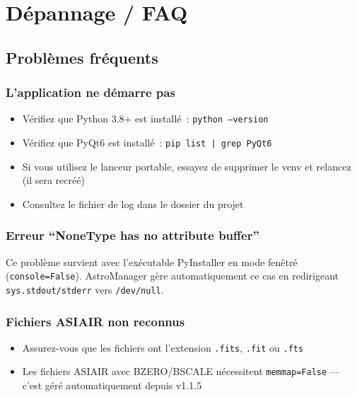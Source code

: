 \documentclass[a4paper,11pt]{article}
\begin{document}
\section{D\'{e}pannage / FAQ}
\label{sec:faq}

\subsection{Probl\`{e}mes fr\'{e}quents}

\subsubsection{L'application ne d\'{e}marre pas}

\begin{itemize}
    \item V\'{e}rifiez que Python 3.8+ est install\'{e}~: \texttt{python --version}
    \item V\'{e}rifiez que PyQt6 est install\'{e}~: \texttt{pip list | grep PyQt6}
    \item Si vous utilisez le lanceur portable, essayez de supprimer le venv et relancez (il sera recr\'{e}\'{e})
    \item Consultez le fichier de log dans le dossier du projet
\end{itemize}

\subsubsection{Erreur ``NoneType has no attribute buffer''}

Ce probl\`{e}me survient avec l'ex\'{e}cutable PyInstaller en mode fen\^{e}tr\'{e} (\texttt{console=False}). AstroManager g\`{e}re automatiquement ce cas en redirigeant \texttt{sys.stdout/stderr} vers \texttt{/dev/null}.

\subsubsection{Fichiers ASIAIR non reconnus}

\begin{itemize}
    \item Assurez-vous que les fichiers ont l'extension \texttt{.fits}, \texttt{.fit} ou \texttt{.fts}
    \item Les fichiers ASIAIR avec BZERO/BSCALE n\'{e}cessitent \texttt{memmap=False} --- c'est g\'{e}r\'{e} automatiquement depuis v1.1.5
\end{itemize}
\end{document}
